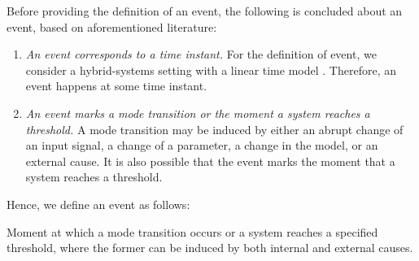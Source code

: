 Before providing the definition of an event, the following is concluded about an event, based on aforementioned literature:

\begin{enumerate}
	\item\textit{An event corresponds to a time instant.}
	\cstart For the definition of event, we consider a hybrid-systems setting with a linear time model \autocite{alur1994theory}. Therefore, an event happens at some time instant.\cend
	
	\item\textit{An event marks a mode transition or the moment a system reaches a threshold.} A mode transition may be \cstart induced \cend by either an abrupt change of an input signal, a change of a parameter, a change in the model, \cstart or an external cause. \cend It is also possible that the event marks the moment that a system reaches a threshold.
	
\end{enumerate}

Hence, we define an event as follows:
\begin{definition}[Event] \label{def:event}
	\cstart Moment at which a mode transition occurs or a system reaches a specified threshold, where the former can be induced by both internal and external causes. \cend 
\end{definition}


